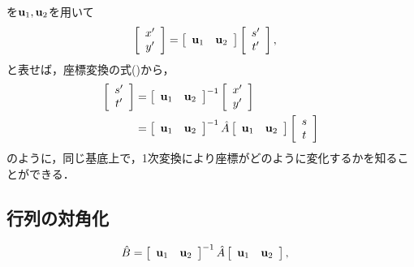 を${\bf u}_{1},{\bf u}_{2}$を用いて
%
\begin{align}
\left[\begin{array}{c}
x^{\prime}\\
y^{\prime}
\end{array}\right] & =\left[\begin{array}{cc}
{\bf u}_{1} & {\bf u}_{2}\end{array}\right]\left[\begin{array}{c}
s^{\prime}\\
t^{\prime}
\end{array}\right],
\end{align}
と表せば，座標変換の式()から，
%
\begin{align}
\left[\begin{array}{c}
s^{\prime}\\
t^{\prime}
\end{array}\right] & =\left[\begin{array}{cc}
{\bf u}_{1} & {\bf u}_{2}\end{array}\right]^{-1}\left[\begin{array}{c}
x^{\prime}\\
y^{\prime}
\end{array}\right]\notag\\
 & =\left[\begin{array}{cc}
{\bf u}_{1} & {\bf u}_{2}\end{array}\right]^{-1}\hat{A}\left[\begin{array}{cc}
{\bf u}_{1} & {\bf u}_{2}\end{array}\right]\left[\begin{array}{c}
s\\
t
\end{array}\right]
\end{align}
のように，同じ基底上で，1次変換により座標がどのように変化するかを知ることができる．
%
%
\subsection{行列の対角化}
%
\begin{align}
\hat{B} & =\left[\begin{array}{cc}
{\bf u}_{1} & {\bf u}_{2}\end{array}\right]^{-1}\hat{A}\left[\begin{array}{cc}
{\bf u}_{1} & {\bf u}_{2}\end{array}\right], 
\end{align}
%
